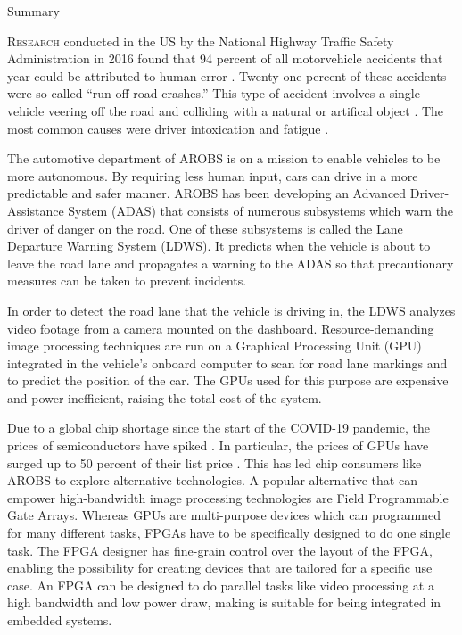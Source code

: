 \documentclass{matthijs}
\begin{document}

	\thispagestyle{empty}
	

	\begin{hoofdstuk*}{Summary}

		\setlength\parindent{1.5em}
		\setlength{\parskip}{0.5em plus 0.2em minus 0.1em}
		\linespread{1.2}

		\lettrine[findent=0.3em, nindent=0.0em, lraise=0.03]{R}{esearch} conducted in the US by the National Highway Traffic Safety Administration in 2016 found that 94 percent of all motorvehicle accidents that year could be attributed to human error \cite{nhtsa2017fatal}.
		Twenty-one percent of these accidents were so-called ``run-off-road crashes.''
		This type of accident involves a single vehicle veering off the road and colliding with a natural or artifical object \cite{liu2009factors}.
		The most common causes were driver intoxication and fatigue \cite{nhtsa2017fatal}.

		The automotive department of AROBS is on a mission to enable vehicles to be more autonomous.
		By requiring less human input, cars can drive in a more predictable and safer manner.
		AROBS has been developing an Advanced Driver-Assistance System (ADAS) that consists of numerous subsystems which warn the driver of danger on the road.
		One of these subsystems is called the Lane Departure Warning System (LDWS).
		It predicts when the vehicle is about to leave the road lane and propagates a warning to the ADAS so that precautionary measures can be taken to prevent incidents.

		In order to detect the road lane that the vehicle is driving in, the LDWS analyzes video footage from a camera mounted on the dashboard.
		Resource-demanding image processing techniques are run on a Graphical Processing Unit (GPU) integrated in the vehicle's onboard computer to scan for road lane markings and to predict the position of the car.
		The GPUs used for this purpose are expensive and power-inefficient, raising the total cost of the system.

		Due to a global chip shortage since the start of the COVID-19 pandemic, the prices of semiconductors have spiked \cite{ivanova2021chip}.
		In particular, the prices of GPUs have surged up to 50 percent of their list price \cite{cheng2021chip}.
		This has led chip consumers like AROBS to explore alternative technologies.
		A popular alternative that can empower high-bandwidth image processing technologies are Field Programmable Gate Arrays.
		Whereas GPUs are multi-purpose devices which can programmed for many different tasks, FPGAs have to be specifically designed to do one single task.
		The FPGA designer has fine-grain control over the layout of the FPGA, enabling the possibility for creating devices that are tailored for a specific use case.
		An FPGA can be designed to do parallel tasks like video processing at a high bandwidth and low power draw, making is suitable for being integrated in embedded systems.


\end{hoofdstuk*}
\end{document}
